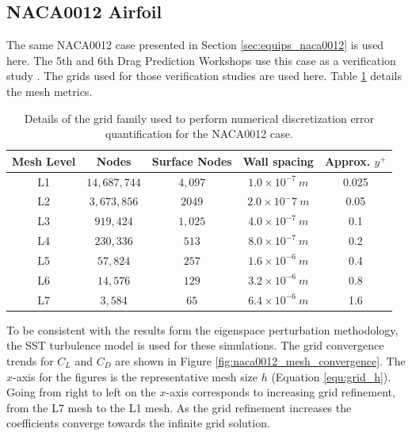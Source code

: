 \subsection{NACA0012 Airfoil} \label{sec:num_err_naca0012}

The same NACA0012 case presented in Section \ref{sec:equips_naca0012} is used here. 
The 5th and 6th Drag Prediction Workshops use this case as a verification study \cite{levy2013summary,roy2017summary}.
The grids used for those verification studies are used here.
Table \ref{tab:naca0012_meshes} details the mesh metrics.

\begin{table}
    \renewcommand{\arraystretch}{1.2}
    \centering
    \begin{tabular}{ c|c|c|c|c } 
         Mesh Level & Nodes & Surface Nodes & Wall spacing & Approx. $y^+$  \\ 
         \hline
         L1 & $14,687,744$ & $4,097$ & $1.0\times10^{-7}~m$ & 0.025\\
         L2 & $3,673,856$ & $2049$ & $2.0\times10^-7~m$ & 0.05\\
         L3 & $919,424$ & $1,025$ & $4.0\times10^{-7}~m$ & 0.1\\
         L4 & $230,336$ & $513$ & $8.0\times10^{-7}~m$ & 0.2\\
         L5 & $57,824$ & $257$ & $1.6\times10^{-6}~m$ & 0.4\\
         L6 & $14,576$ & $129$ & $3.2\times10^{-6}~m$ & 0.8\\
         L7 & $3,584$ & $65$ & $6.4\times10^{-6}~m$ & 1.6\\
        
    \end{tabular}
    \caption{Details of the grid family used to perform numerical discretization error quantification for the NACA0012 case.}
    \label{tab:naca0012_meshes}
\end{table}

To be consistent with the results form the eigenspace perturbation methodology, the SST turbulence model is used for these simulations. 
The grid convergence trends for $C_L$ and $C_D$ are shown in Figure \ref{fig:naca0012_mesh_convergence}.
The $x$-axis for the figures is the representative mesh size $h$ (Equation \ref{equ:grid_h}). 
Going from right to left on the $x$-axis corresponds to increasing grid refinement, from the L7 mesh to the L1 mesh. 
As the grid refinement increases the coefficients converge towards the infinite grid solution.

